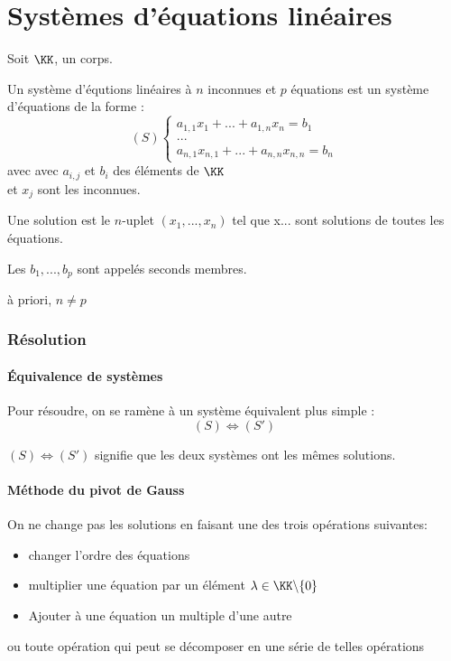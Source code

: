 \documentclass[../main.tex]{subfile}
\begin{document}
\part{Systèmes d'équations linéaires}

Soit $\KK$, un corps.
\begin{defi}
	Un système d'équtions linéaires à $n$ inconnues et $p$ équations est un système d'équations de la forme :
	$$
	(S)
	\left\{
	\begin{array}{l}
		a_{1,1}x_1 + ... + a_{1,n}x_n = b_1\\
		...\\
		a_{n,1}x_{n,1} + ... + a_{n, n}x_{n,n} = b_n
	\end{array}
	\right.
	$$
	avec avec $a_{i,j}$ et $b_i$ des éléments de $\KK$\\
	et $x_j$ sont les inconnues.
\end{defi}

\begin{defi}
	Une solution est le $n$-uplet $(x_1, ..., x_n)$ tel que x... sont solutions de toutes les équations.
\end{defi}

\begin{defi}
	Les $b_1, ..., b_p$ sont appelés seconds membres.
\end{defi}

\begin{rema}
	à priori, $n \neq p$ 
\end{rema}


\section{Résolution}
\subsection{\'Equivalence de systèmes}
Pour résoudre, on se ramène à un système équivalent plus simple :
$$
(S) \Leftrightarrow (S') 
$$

$(S) \Leftrightarrow (S')$ signifie que les deux systèmes ont les mêmes solutions.

\subsection{Méthode du pivot de Gauss}
On ne change pas les solutions en faisant une des trois opérations suivantes:
\begin{itemize}
	\item changer l'ordre des équations
	\item multiplier une équation par un élément $\lambda \in \KK \backslash \{0\}$
	\item Ajouter à une équation un multiple d'une autre
\end{itemize}
ou toute opération qui peut se décomposer en une série de telles opérations
\end{document}
